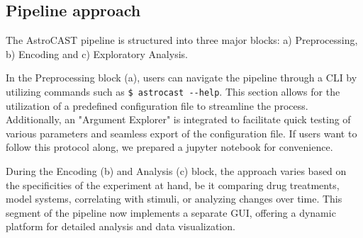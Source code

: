 \subsection{Pipeline approach}
The AstroCAST pipeline is structured into three major blocks: a) Preprocessing, b) Encoding and c) Exploratory Analysis.

In the Preprocessing block (a), users can navigate the pipeline through a \ac{CLI} by utilizing commands such as \lstinline[style=bashStyle]{$ astrocast --help}. This section allows for the utilization of a predefined configuration file to streamline the process. Additionally, an "Argument Explorer" is integrated to facilitate quick testing of various parameters and seamless export of the configuration file. If users want to follow this protocol along, we prepared a jupyter notebook for convenience.

During the Encoding (b) and Analysis (c) block, the approach varies based on the specificities of the experiment at
hand, be it comparing drug treatments, model systems, correlating with stimuli, or analyzing changes over time. This
segment of the pipeline now implements a separate GUI, offering a dynamic platform for detailed analysis and data
visualization.
